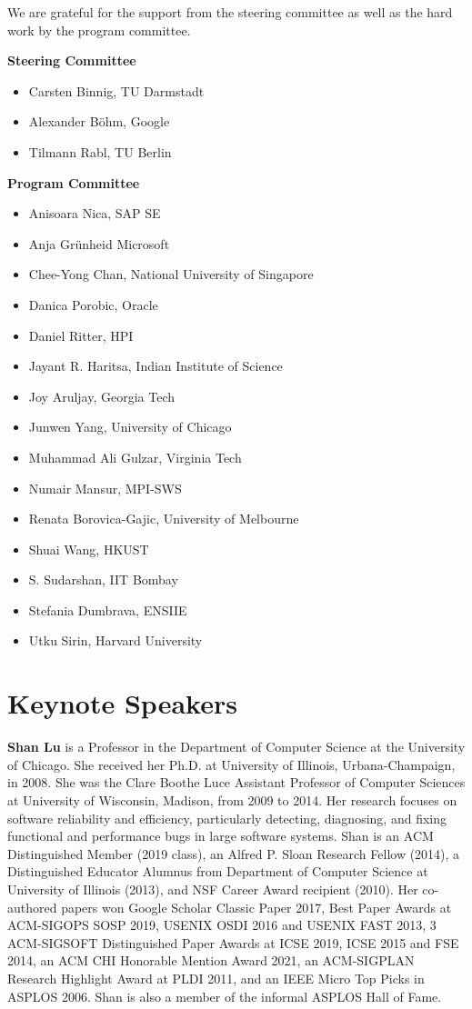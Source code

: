 \documentclass[sigconf]{acmart}
\begin{document}
We are grateful for the support from the steering committee as well as the hard work by the program committee.

\textbf{Steering Committee}
\begin{itemize}
	\item Carsten Binnig, TU Darmstadt
	\item Alexander Böhm, Google
	\item Tilmann Rabl, TU Berlin
\end{itemize}

\noindent{}\textbf{Program Committee}
\begin{itemize}
	\item Anisoara Nica, SAP SE
	\item Anja Grünheid Microsoft
	\item Chee-Yong Chan, National University of Singapore
	\item Danica Porobic, Oracle
	\item Daniel Ritter, HPI
	\item Jayant R. Haritsa, Indian Institute of Science
	\item Joy Aruljay, Georgia Tech
	\item Junwen Yang, University of Chicago
	\item Muhammad Ali Gulzar, Virginia Tech
	\item Numair Mansur, MPI-SWS
	\item Renata Borovica-Gajic, University of Melbourne
	\item Shuai Wang, HKUST
	\item S. Sudarshan, IIT Bombay
	\item Stefania Dumbrava, ENSIIE
	\item Utku Sirin, Harvard University
\end{itemize}

\section{Keynote Speakers}
\textbf{Shan Lu} is a Professor in the Department of Computer Science at the University of Chicago.
She received her Ph.D. at University of Illinois, Urbana-Champaign, in 2008. She was the Clare Boothe Luce Assistant Professor of Computer Sciences at University of Wisconsin, Madison, from 2009 to 2014. Her research focuses on software reliability and efficiency, particularly detecting, diagnosing, and fixing functional and performance bugs in large software systems.
Shan is an ACM Distinguished Member (2019 class), an Alfred P. Sloan Research Fellow (2014), a Distinguished Educator Alumnus from Department of Computer Science at University of Illinois (2013), and NSF Career Award recipient (2010).
Her co-authored papers won Google Scholar Classic Paper 2017, Best Paper Awards at ACM-SIGOPS SOSP 2019, USENIX OSDI 2016 and USENIX FAST 2013, 3 ACM-SIGSOFT Distinguished Paper Awards at ICSE 2019, ICSE 2015 and FSE 2014, an ACM CHI Honorable Mention Award 2021, an ACM-SIGPLAN Research Highlight Award at PLDI 2011, and an IEEE Micro Top Picks in ASPLOS 2006. Shan is also a member of the informal ASPLOS Hall of Fame.
\end{document}

